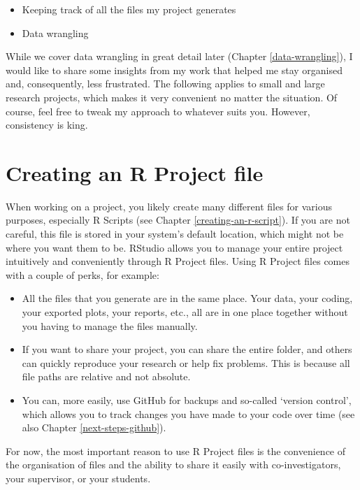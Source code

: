 \documentclass[
]{book}
\begin{document}
\begin{itemize}
\item
  Keeping track of all the files my project generates
\item
  Data wrangling
\end{itemize}

While we cover data wrangling in great detail later (Chapter \ref{data-wrangling}), I would like to share some insights from my work that helped me stay organised and, consequently, less frustrated. The following applies to small and large research projects, which makes it very convenient no matter the situation. Of course, feel free to tweak my approach to whatever suits you. However, consistency is king.

\hypertarget{creating-an-r-project}{%
\section{Creating an R Project file}\label{creating-an-r-project}}

When working on a project, you likely create many different files for various purposes, especially R Scripts (see Chapter \ref{creating-an-r-script}). If you are not careful, this file is stored in your system's default location, which might not be where you want them to be. RStudio allows you to manage your entire project intuitively and conveniently through R Project files. Using R Project files comes with a couple of perks, for example:

\begin{itemize}
\item
  All the files that you generate are in the same place. Your data, your coding, your exported plots, your reports, etc., all are in one place together without you having to manage the files manually.
\item
  If you want to share your project, you can share the entire folder, and others can quickly reproduce your research or help fix problems. This is because all file paths are relative and not absolute.
\item
  You can, more easily, use GitHub for backups and so-called `version control', which allows you to track changes you have made to your code over time (see also Chapter \ref{next-steps-github}).
\end{itemize}

For now, the most important reason to use R Project files is the convenience of the organisation of files and the ability to share it easily with co-investigators, your supervisor, or your students.
\end{document}
